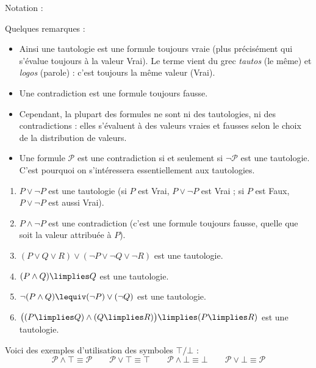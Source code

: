 \documentclass[11pt,class=report,crop=false]{standalone}
\begin{document}
Notation :

Quelques remarques : 
\begin{itemize}
	\item Ainsi une tautologie est une formule toujours vraie (plus précisément qui s'évalue toujours à la valeur Vrai). 
	Le terme vient du grec \emph{tautos} (le même) et \emph{logos} (parole) : c'est toujours la même valeur (Vrai).
	\item Une contradiction est une formule toujours fausse. 
	\item Cependant, la plupart des formules ne sont ni des tautologies, ni des contradictions : elles s'évaluent à des valeurs vraies et fausses selon le choix de la distribution de valeurs. 
	\item Une formule $\mathcal{P}$ est une contradiction si et seulement si $\lnot\mathcal{P}$ est une tautologie. C'est pourquoi on s'intéressera essentiellement aux tautologies.
\end{itemize}

\begin{exemple}
	\sauteligne
	\begin{enumerate}
		\item $P \lor \lnot P$ est une tautologie (si $P$ est Vrai, $P \lor \lnot P$ est Vrai ; si $P$ est Faux, $P \lor \lnot P$ est aussi Vrai).
		
		\item $P \land \lnot P$ est une contradiction (c'est une formule toujours fausse, quelle que soit la valeur attribuée à $P$).
		
		\item $(P \lor Q \lor R) \lor (\lnot P \lor \lnot Q \lor \lnot R)$ est une tautologie.
		
		\item $(P \land Q) \limplies Q$ est une tautologie.
		
		\item $\lnot(P \land Q) \lequiv (\lnot P) \lor (\lnot Q)$ est une tautologie.
		
		\item $\big( (P \limplies Q) \land (Q \limplies R) \big) \limplies (P \limplies R)$ est une tautologie.
	\end{enumerate}
\end{exemple}	

Voici des exemples d'utilisation des symboles $\top/\bot$ :
\[
\mathcal{P} \land \top \equiv \mathcal{P} \qquad
\mathcal{P} \lor \top \equiv \top \qquad
\mathcal{P} \land \bot \equiv \bot \qquad
\mathcal{P} \lor \bot \equiv \mathcal{P}
\]
\end{document}
